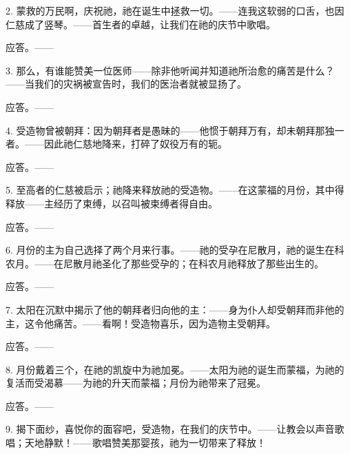 2. 蒙救的万民啊，庆祝祂，祂在诞生中拯救一切。——连我这软弱的口舌，也因仁慈成了竖琴。——首生者的卓越，让我们在祂的庆节中歌唱。\par

应答。——\par

3. 那么，有谁能赞美一位医师——除非他听闻并知道祂所治愈的痛苦是什么？——当我们的灾祸被宣告时，我们的医治者就被显扬了。\par

应答。——\par

4. 受造物曾被朝拜：因为朝拜者是愚昧的——他惯于朝拜万有，却未朝拜那独一者。——因此祂仁慈地降来，打碎了奴役万有的轭。\par

应答。——\par

5. 至高者的仁慈被启示；祂降来释放祂的受造物。——在这蒙福的月份，其中得释放——主经历了束缚，以召叫被束缚者得自由。\par

应答。——\par

6. 月份的主为自己选择了两个月来行事。——祂的受孕在尼散月，祂的诞生在科农月。——在尼散月祂圣化了那些受孕的；在科农月祂释放了那些出生的。\par

应答。——\par

7. 太阳在沉默中揭示了他的朝拜者归向他的主：——身为仆人却受朝拜而非他的主，这令他痛苦。——看啊！受造物喜乐，因为造物主受朝拜。\par

应答。——\par

8. 月份戴着三个，在祂的凯旋中为祂加冕。——太阳为祂的诞生而蒙福，为祂的复活而受渴慕——为祂的升天而蒙福；月份为祂带来了冠冕。\par

应答。——\par

9. 揭下面纱，喜悦你的面容吧，受造物，在我们的庆节中。——让教会以声音歌唱；天地静默！——歌唱赞美那婴孩，祂为一切带来了释放！\par

